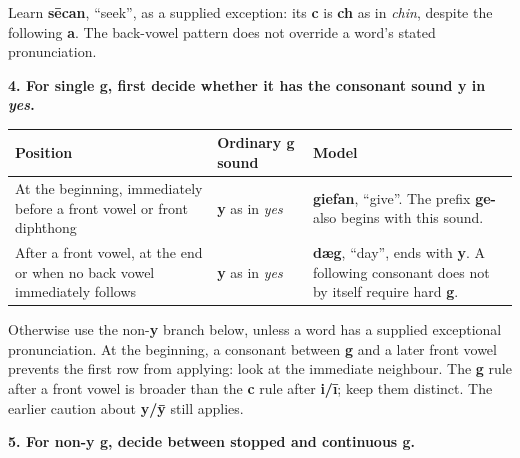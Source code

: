 Learn \textbf{sēcan}, “seek”, as a supplied exception: its \textbf{c} is \textbf{ch} as in \emph{chin}, despite the following \textbf{a}. The back-vowel pattern does not override a word's stated pronunciation.

\textbf{4. For single g, first decide whether it has the consonant sound y in \emph{yes}.}\par\nobreak

\par\begingroup
\fontsize{10.5}{13.2}\selectfont
\setlength{\LTleft}{0pt}\setlength{\LTright}{\fill}
\noindent
\begin{tabular}{@{}>{\raggedright\arraybackslash}p{46.0mm}>{\raggedright\arraybackslash}p{20.0mm}>{\raggedright\arraybackslash}p{52.376mm}@{}}
\toprule
\textbf{Position} & \textbf{Ordinary g sound} & \textbf{Model} \\
\midrule
At the beginning, immediately before a front vowel or front diphthong & \textbf{y} as in \emph{yes} & \textbf{giefan}, “give”. The prefix \textbf{ge-} also begins with this sound. \\
After a front vowel, at the end or when no back vowel immediately follows & \textbf{y} as in \emph{yes} & \textbf{dæg}, “day”, ends with \textbf{y}. A following consonant does not by itself require hard \textbf{g}. \\
\bottomrule
\end{tabular}
\par\endgroup

Otherwise use the non-\textbf{y} branch below, unless a word has a supplied exceptional pronunciation. At the beginning, a consonant between \textbf{g} and a later front vowel prevents the first row from applying: look at the immediate neighbour. The \textbf{g} rule after a front vowel is broader than the \textbf{c} rule after \textbf{i/\allowbreak{}ī}; keep them distinct. The earlier caution about \textbf{y/\allowbreak{}ȳ} still applies.

\textbf{5. For non-y g, decide between stopped and continuous g.}\par\nobreak

